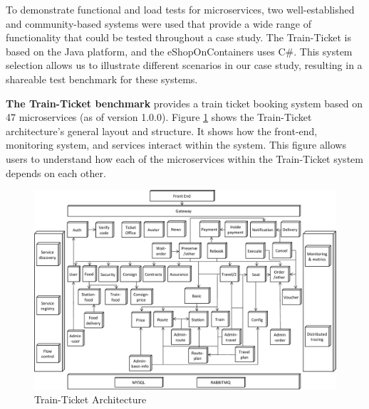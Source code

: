 To demonstrate functional and load tests for microservices, two well-established and community-based systems were used that provide a wide range of functionality that could be tested throughout a case study. The Train-Ticket \cite{trainticket} is based on the Java platform, and the eShopOnContainers \cite{eshop} uses C\#. This system selection allows us to illustrate different scenarios in our case study, resulting in a shareable test benchmark for these systems.


{\bf The Train-Ticket benchmark} provides a train ticket booking system based on 47 microservices (as of version 1.0.0). Figure \ref{fig:train} shows the Train-Ticket architecture's general layout and structure. It shows how the front-end, monitoring system, and services interact within the system. This figure allows users to understand how each of the microservices within the Train-Ticket system depends on each other.


\begin{figure}[h]
    \centering
    \hspace{-1.3em}
    \includegraphics[width=1.02\columnwidth]{img/trainticket-our.pdf}
       \caption{Train-Ticket Architecture \cite{trainticket}}
       \label{fig:train}
\end{figure}

